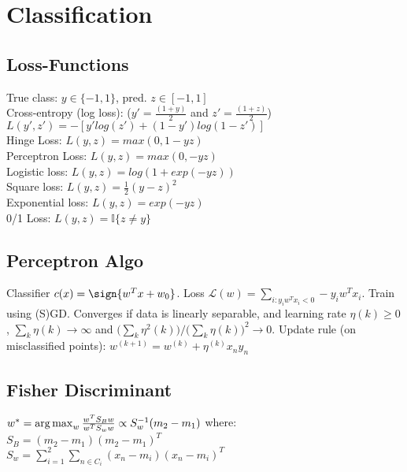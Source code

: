 \section{Classification}
\subsection*{Loss-Functions}
True class: $y \in \{-1,1\}$, pred. $z \in [-1,1]$\\
Cross-entropy (log loss): ($y'=\tfrac{(1+y)}{2}$ and $z'=\tfrac{(1+z)}{2}$) $L(y',z') {=} -[y'log(z') {+} (1-y')log(1-z')]$ \\
Hinge Loss: $L(y,z) = max(0, 1-yz)$ \\
Perceptron Loss: $L(y,z) = max(0, -yz)$ \\
Logistic loss: $L(y,z) = log(1 + exp(-yz))$ \\
Square loss: $L(y,z) = \tfrac{1}{2}(y-z)^2$ \\
Exponential loss: $L(y,z) = exp(-yz)$ \\
0/1 Loss: $L(y,z) = \mathbb{I}\{z \neq y\}$ 



\subsection*{Perceptron Algo} 
Classifier $c(x) = \sign{w^Tx + w_0}$.
Loss $\mathcal{L}(w) = \sum_{i: y_iw^Tx_i < 0} -y_iw^T x_i$.
Train using (S)GD. Converges if data is linearly separable, and
learning rate $\eta(k) \geq 0$, $\sum_{k}\eta(k) \rightarrow \infty$ and
$\big(\sum_{k} \eta^2(k)\big)
/
\big(\sum_{k} \eta(k)\big)^2
\rightarrow 0$. Update rule (on misclassified points): $w^{(k+1)} = w^{(k)} + \eta^{(k)}x_ny_n$

\subsection*{Fisher Discriminant}
\(w^{*} = \operatorname*{arg\,max}_w \frac{w^TS_Bw}{w^TS_ww} \propto S_w^{-1}(m_2-m_1)\) where: \\
$S_B = (m_2-m_1)(m_2-m_1)^T$\\
$S_w= \sum_{i=1}^{2}\sum_{n \in C_i} (x_n-m_i)(x_n-m_i)^T$

